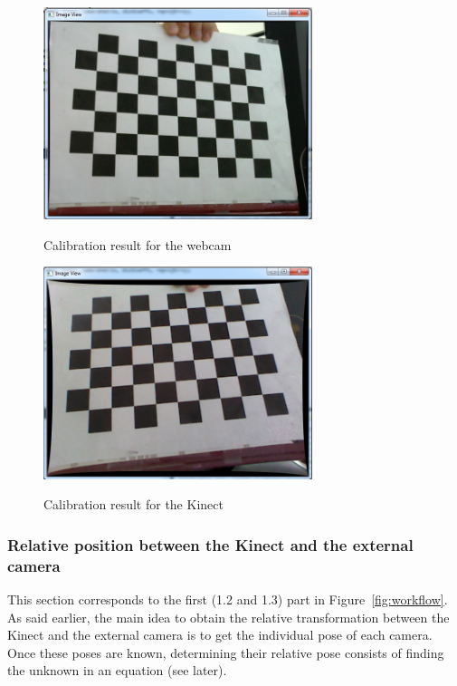 \begin{figure}
\caption{Calibration result for the webcam}
\centering
    \includegraphics[width=0.7\textwidth]{images/resultCalibWebcam.png}
\label{fig:calibration result for the webcam}
\end{figure}

\begin{figure}
\caption{Calibration result for the Kinect}
\centering
    \includegraphics[width=0.7\textwidth]{images/resultCalibKinect.png}
\label{fig:calibration result for the kinect}
\end{figure}

\subsubsection{Relative position between the Kinect and the external camera}
\label{sec:Relative position between the Kinect and the external camera}
This section corresponds to the first (1.2 and 1.3) part in Figure~\ref{fig:workflow}.\\

As said earlier, the main idea to obtain the relative transformation between the Kinect and the external camera is to get the individual pose of each camera. Once these poses are known, determining their relative pose consists of finding the unknown in an equation (see later).\\


